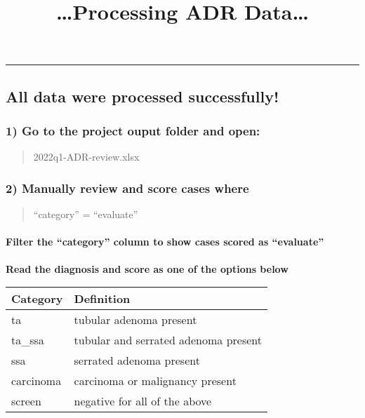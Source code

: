 \documentclass[
]{article}
\title{\ldots Processing ADR Data\ldots{}}
\author{}
\date{\vspace{-2.5em}}
\begin{document}
\maketitle

\begin{center}\rule{0.5\linewidth}{0.5pt}\end{center}

\hypertarget{all-data-were-processed-successfully}{%
\subsection{All data were processed
successfully!}\label{all-data-were-processed-successfully}}

\hypertarget{go-to-the-project-ouput-folder-and-open}{%
\subsubsection{1) Go to the project ouput folder and
open:}\label{go-to-the-project-ouput-folder-and-open}}

\begin{quote}
2022q1-ADR-review.xlsx
\end{quote}

\hypertarget{manually-review-and-score-cases-where}{%
\subsubsection{2) Manually review and score cases
where}\label{manually-review-and-score-cases-where}}

\begin{quote}
``category'' = ``evaluate''
\end{quote}

\hypertarget{filter-the-category-column-to-show-cases-scored-as-evaluate}{%
\paragraph{Filter the ``category'' column to show cases scored as
``evaluate''}\label{filter-the-category-column-to-show-cases-scored-as-evaluate}}

\textbf{Read the diagnosis and score as one of the options below}

\begin{longtable}[]{@{}ll@{}}
\toprule
Category & Definition \\
\midrule
\endhead
ta & tubular adenoma present \\
ta\_ssa & tubular and serrated adenoma present \\
ssa & serrated adenoma present \\
carcinoma & carcinoma or malignancy present \\
screen & negative for all of the above \\
\bottomrule
\end{longtable}
\end{document}
